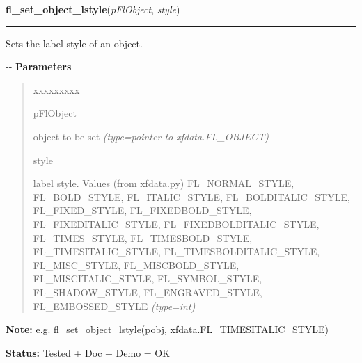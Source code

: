 \hspace{.8\funcindent}\begin{boxedminipage}{\funcwidth}

    \raggedright \textbf{fl\_set\_object\_lstyle}(\textit{pFlObject}, \textit{style})

    \vspace{-1.5ex}

    \rule{\textwidth}{0.5\fboxrule}
\setlength{\parskip}{2ex}

Sets the label style of an object.

-{}-
\setlength{\parskip}{1ex}
      \textbf{Parameters}
      \vspace{-1ex}

      \begin{quote}
        \begin{Ventry}{xxxxxxxxx}

          \item[pFlObject]


object to be set
            {\it (type=pointer to xfdata.FL\_OBJECT)}

          \item[style]


label style. Values (from xfdata.py) FL\_NORMAL\_STYLE,
FL\_BOLD\_STYLE, FL\_ITALIC\_STYLE, FL\_BOLDITALIC\_STYLE, FL\_FIXED\_STYLE,
FL\_FIXEDBOLD\_STYLE, FL\_FIXEDITALIC\_STYLE, FL\_FIXEDBOLDITALIC\_STYLE,
FL\_TIMES\_STYLE, FL\_TIMESBOLD\_STYLE, FL\_TIMESITALIC\_STYLE,
FL\_TIMESBOLDITALIC\_STYLE, FL\_MISC\_STYLE, FL\_MISCBOLD\_STYLE,
FL\_MISCITALIC\_STYLE, FL\_SYMBOL\_STYLE, FL\_SHADOW\_STYLE,
FL\_ENGRAVED\_STYLE, FL\_EMBOSSED\_STYLE
            {\it (type=int)}

        \end{Ventry}

      \end{quote}

\textbf{Note:} 
e.g. fl\_set\_object\_lstyle(pobj, xfdata.FL\_TIMESITALIC\_STYLE)


\textbf{Status:} 
Tested + Doc + Demo = OK


    \end{boxedminipage}

    \label{xformslib:flbasic:fl_get_object_lstyle}

    \vspace{0.5ex}

